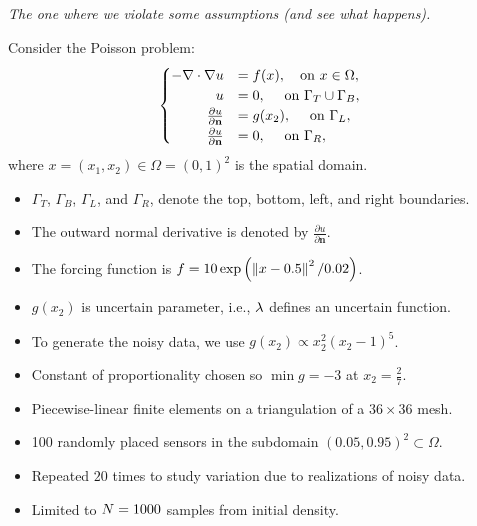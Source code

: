 \begin{frame}{\it The one where we violate some assumptions (and see what happens).}

Consider the Poisson problem:
\begin{equation}\label{eq:pde-equation}
\begin{cases}
\hfill -\nabla \cdot \nabla u &= f(x), \quad\text{on } x\in \Omega, \\
\hfill u &= 0, \quad\text{ on } \Gamma_T \cup \Gamma_B, \\
\hfill \frac{\partial u}{\partial \mathbf{n}} &= g(x_2), \quad\text{ on } \Gamma_L, \\
\hfill \frac{\partial u}{\partial \mathbf{n}} &= 0, \quad\text{ on } \Gamma_R,
\end{cases}
\end{equation}
where $x=(x_1, x_2) \in \Omega = (0,1)^2$ is the spatial domain.

\bigskip
\begin{itemize}
\item $\Gamma_T$, $\Gamma_B$, $\Gamma_L$, and $\Gamma_R$, denote the top, bottom, left, and right boundaries.
\bigskip
\item The outward normal derivative is denoted by $\frac{\partial u}{\partial \mathbf{n}}$.
\bigskip
\item The forcing function is $f = 10\exp\left ( \left\Vert x - 0.5\right\Vert^2 / 0.02 \right )$.
\end{itemize}

\end{frame}


\begin{frame}[t]

\begin{itemize}

\item $g(x_2)$ is uncertain parameter, i.e., $\lambda$ defines an uncertain function.

\bigskip
\item To generate the noisy data, we use $g(x_2)\propto x_2^2(x_2-1)^5$.

\bigskip
\item Constant of proportionality chosen so $\min{g}=-3$ at $x_2=\frac{2}{7}$.

\bigskip
\bigskip
\item Piecewise-linear finite elements on a triangulation of a $36\times36$ mesh.

\bigskip
\item 100 randomly placed sensors in the subdomain $(0.05, 0.95)^2 \subset \Omega$.

\bigskip
\bigskip
\item Repeated $20$ times to study variation due to realizations of noisy data.

\bigskip
\item Limited to $N = 1000$ samples from initial density.
\end{itemize}

\end{frame}


